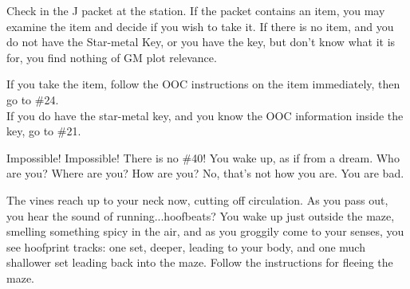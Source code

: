 \documentclass[green]{gl2018}
\begin{document}
\begin{large}
\begin{location}{38}
\begin{fromhere}
\end{fromhere}
\end{location}
\begin{location}{39}
 Check in the J packet at the station.  If the packet contains an item, you may examine the item and decide if you wish to take it.  If there is no item, and you do not have the Star-metal Key, or you have the key, but don't know what it is for, you find nothing of GM plot relevance. 
\begin{fromhere}
If you take the item, follow the OOC instructions on the item immediately, then go to \#24.\\
If you do have the star-metal key, and you know the OOC information inside the key, go to \#21.
\end{fromhere}
\end{location}
\begin{location}{40}
Impossible!  Impossible!  There is no \#40!  You wake up, as if from a dream.  Who are you?  Where are you?  How are you?  No, that's not how you are.  You are bad.
\end{location}
\begin{location}{41}
The vines reach up to your neck now, cutting off circulation.  As you pass out, you hear the sound of running...hoofbeats?  You wake up just outside the maze, smelling something spicy in the air, and as you groggily come to your senses, you see hoofprint tracks: one set, deeper, leading to your body, and one much shallower set leading back into the maze.  Follow the instructions for fleeing the maze.
\end{location}
\end{large}
\end{document}
